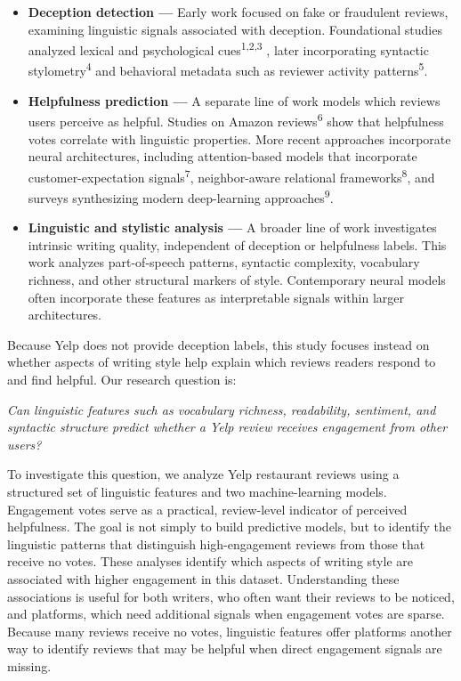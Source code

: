 \documentclass[12pt]{article}
\begin{document}
\begin{itemize}

\item \textbf{Deception detection —}
Early work focused on fake or fraudulent reviews, examining linguistic signals associated with deception. Foundational studies analyzed lexical and psychological cues\textsuperscript{1,2,3}
, later incorporating syntactic stylometry\textsuperscript{4} and behavioral metadata such as reviewer activity patterns\textsuperscript{5}.

\item \textbf{Helpfulness prediction —}  
A separate line of work models which reviews users perceive as helpful. 
Studies on Amazon reviews\textsuperscript{6} show that helpfulness votes correlate with linguistic properties.  
More recent approaches incorporate neural architectures, including attention-based models that incorporate customer-expectation signals\textsuperscript{7},  
neighbor-aware relational frameworks\textsuperscript{8}, and surveys synthesizing modern deep-learning approaches\textsuperscript{9}.

\item \textbf{Linguistic and stylistic analysis —}  
A broader line of work investigates intrinsic writing quality, independent of deception or helpfulness labels. This work analyzes part-of-speech patterns, syntactic complexity, vocabulary richness, and other structural markers of style. Contemporary neural models often incorporate these features as interpretable signals within larger architectures.

\end{itemize}


Because Yelp does not provide deception labels, this study focuses instead on whether aspects of writing style help 
explain which reviews readers respond to and find helpful. Our research question is: 

\emph{Can linguistic features such as vocabulary richness, readability, sentiment, and syntactic structure predict whether a Yelp review receives engagement from other users?}

To investigate this question, we analyze Yelp restaurant reviews using a structured set of linguistic features and two machine-learning models.
 Engagement votes serve as a practical, review-level indicator of perceived helpfulness. The goal is not simply to build predictive models, 
 but to identify the linguistic patterns that distinguish high-engagement reviews from those that receive no votes. 
 These analyses identify which aspects of writing style are associated with higher engagement in this dataset. 
 Understanding these associations is useful for both writers, who often want their reviews to be noticed, and platforms, 
 which need additional signals when engagement votes are sparse. Because many reviews receive no votes, linguistic features offer platforms another way to identify reviews that may be helpful when direct engagement signals are missing.
\end{document}
